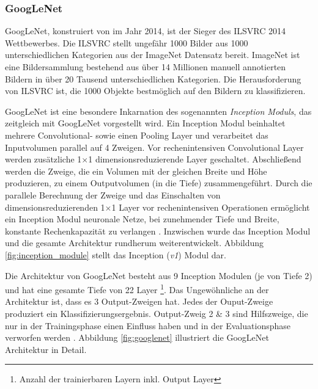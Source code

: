 \subsubsection{GoogLeNet}
\label{sec:googlenet}
GoogLeNet, konstruiert von \citet{szegedyGoingDeeperConvolutions2015} im Jahr 2014, ist der Sieger des ILSVRC 2014 Wettbewerbes. Die ILSVRC stellt ungefähr 1000 Bilder aus 1000 unterschiedlichen Kategorien aus der ImageNet Datensatz bereit. ImageNet ist eine Bildersammlung bestehend aus über 14 Millionen manuell annotierten Bildern in über 20 Tausend unterschiedlichen Kategorien. Die Herausforderung von ILSVRC ist, die 1000 Objekte bestmöglich auf den Bildern zu klassifizieren.

GoogLeNet ist eine besondere Inkarnation des sogenannten \textit{Inception Moduls}, das zeitgleich mit GoogLeNet vorgestellt wird.
Ein Inception Modul beinhaltet mehrere Convolutional- sowie einen Pooling Layer und verarbeitet das Inputvolumen parallel auf 4 Zweigen. Vor rechenintensiven Convolutional Layer werden zusätzliche 1$\times$1 dimensionsreduzierende Layer geschaltet. Abschließend werden die Zweige, die ein Volumen mit der gleichen Breite und Höhe produzieren, zu einem Outputvolumen (in die Tiefe) zusammengeführt. Durch die parallele Berechnung der Zweige und das Einschalten von dimensionsreduzierenden 1$\times$1 Layer vor rechenintensiven Operationen ermöglicht ein Inception Modul neuronale Netze, bei zunehmender Tiefe und Breite, konstante Rechenkapazität zu verlangen \cite{szegedyGoingDeeperConvolutions2015}.
Inzwischen wurde das Inception Modul \cite{szegedyRethinkingInceptionArchitecture2016} und die gesamte Architektur rundherum \cite{szegedyInceptionv4InceptionResNetImpact2016} weiterentwickelt. Abbildung \ref{fig:inception_module} stellt das Inception (\textit{v1}) Modul dar.

Die Architektur von GoogLeNet besteht aus 9 Inception Modulen (je von Tiefe 2) und hat eine gesamte Tiefe von 22 Layer \footnote{Anzahl der trainierbaren Layern inkl. Output Layer}. Das Ungewöhnliche an der Architektur ist, dass es 3 Output-Zweigen hat. Jedes der Ouput-Zweige produziert ein Klassifizierungsergebnis. Output-Zweig 2 \& 3 sind Hilfszweige, die nur in der Trainingsphase einen Einfluss haben und in der Evaluationsphase verworfen werden \cite{szegedyGoingDeeperConvolutions2015}. Abbildung \ref{fig:googlenet} illustriert die GoogLeNet Architektur in Detail.

